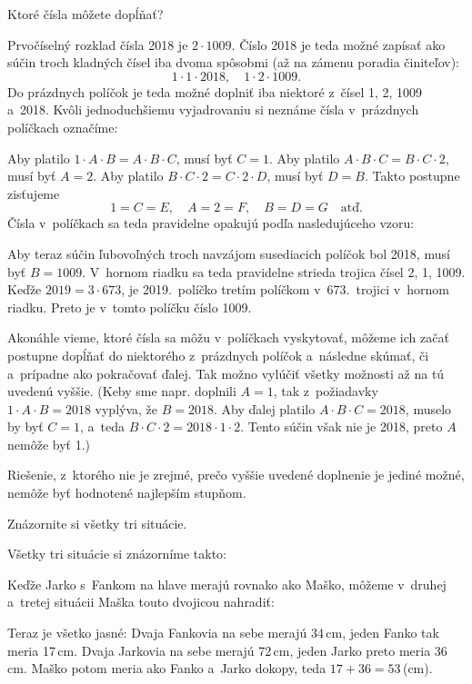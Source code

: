 {%
\napad
Ktoré čísla môžete dopĺňať?

\riesenie
Prvočíselný rozklad čísla 2018 je $2\cdot1009$.
Číslo 2018 je teda možné zapísať ako súčin troch kladných čísel iba dvoma spôsobmi (až na zámenu poradia činiteľov):
$$
1\cdot1\cdot2018,\quad 1\cdot2\cdot1009.
$$
Do prázdnych políčok je teda možné doplniť iba niektoré z~čísel 1, 2, 1009 a~2018.
Kvôli jednoduchšiemu vyjadrovaniu si neznáme čísla v~prázdnych políčkach označíme:
%


Aby platilo $1\cdot A\cdot B=A\cdot B\cdot C$, musí byť $C=1$.
Aby platilo $A\cdot B\cdot C=B\cdot C\cdot 2$, musí byť $A=2$.
Aby platilo $B\cdot C\cdot 2=C\cdot 2\cdot D$, musí byť $D=B$.
Takto postupne zisťujeme
$$
1=C=E,\quad A=2=F,\quad B=D=G\quad\text{atď.}
$$
Čísla v~políčkach sa teda pravidelne opakujú podľa nasledujúceho vzoru:
%


Aby teraz súčin ľubovoľných troch navzájom susediacich políčok bol 2018, musí byť $B=1009$.
V~hornom riadku sa teda pravidelne strieda trojica čísel 2, 1, 1009.
Keďže $2019=3\cdot673$, je 2019.~políčko tretím políčkom v~673.~trojici v~hornom riadku.
Preto je v~tomto políčku číslo 1009.

\poznamka
Akonáhle vieme, ktoré čísla sa môžu v~políčkach vyskytovať,
môžeme ich začať postupne dopĺňať do niektorého z~prázdnych políčok a~následne skúmať, či a~prípadne ako pokračovať ďalej.
Tak možno vylúčiť všetky možnosti až na tú uvedenú vyššie.
(Keby sme napr. doplnili $A=1$, tak z~požiadavky $1\cdot A\cdot B=2018$ vyplýva, že $B=2018$.
Aby ďalej platilo $A\cdot B\cdot C=2018$, muselo by byť $C=1$, a~teda $B\cdot C\cdot 2=2018\cdot1\cdot2$.
Tento súčin však nie je 2018, preto $A$ nemôže byť 1.)

Riešenie, z~ktorého nie je zrejmé, prečo vyššie uvedené doplnenie je jediné možné, nemôže byť hodnotené najlepším stupňom.
}

{%
\napad
Znázornite si všetky tri situácie.

\riesenie
Všetky tri situácie si znázorníme takto:
%


Keďže Jarko s~Fankom na hlave merajú rovnako ako Maško, môžeme v~druhej a~tretej situácii Maška touto dvojicou nahradiť:
%


Teraz je všetko jasné:
Dvaja Fankovia na sebe merajú 34\,cm, jeden Fanko tak meria 17\,cm.
Dvaja Jarkovia na sebe merajú 72\,cm, jeden Jarko preto meria 36\,cm.
Maško potom meria ako Fanko a~Jarko dokopy, teda $17+36=53$\,(cm).

}

